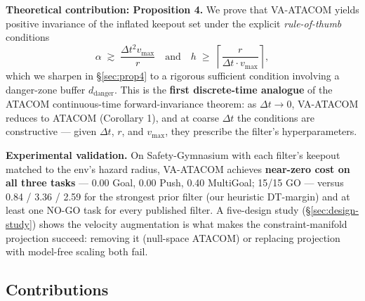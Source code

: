\documentclass[letterpaper]{article}
\begin{document}
\textbf{Theoretical contribution: Proposition 4.} We prove that VA-ATACOM yields positive invariance of the inflated keepout set under the explicit \emph{rule-of-thumb} conditions
\begin{equation}
\alpha \;\gtrsim\; \frac{\Delta t^2 v_{\max}}{r}
\quad\text{and}\quad
h \;\ge\; \left\lceil \frac{r}{\Delta t \cdot v_{\max}} \right\rceil,
\end{equation}
which we sharpen in \S\ref{sec:prop4} to a rigorous sufficient condition involving a danger-zone buffer $d_\text{danger}$. This is the \textbf{first discrete-time analogue} of the ATACOM continuous-time forward-invariance theorem: as $\Delta t \to 0$, VA-ATACOM reduces to ATACOM (Corollary 1), and at coarse $\Delta t$ the conditions are constructive — given $\Delta t$, $r$, and $v_{\max}$, they prescribe the filter's hyperparameters.

\textbf{Experimental validation.} On Safety-Gymnasium with each filter's keepout matched to the env's hazard radius, VA-ATACOM achieves \textbf{near-zero cost on all three tasks} --- 0.00 Goal, 0.00 Push, 0.40 MultiGoal; 15/15 GO --- versus 0.84 / 3.36 / 2.59 for the strongest prior filter (our heuristic DT-margin) and at least one NO-GO task for every published filter. A five-design study (\S\ref{sec:design-study}) shows the velocity augmentation is what makes the constraint-manifold projection succeed: removing it (null-space ATACOM) or replacing projection with model-free scaling both fail.

\subsection{Contributions}
\end{document}
